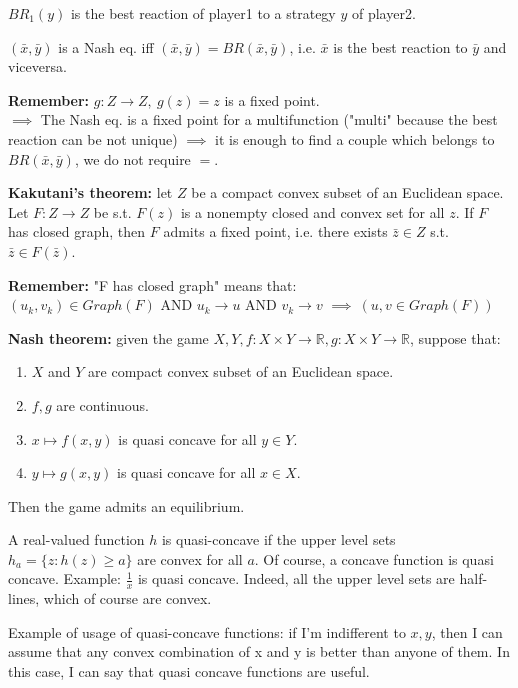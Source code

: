 \noindent $BR_1(y)$ is the best reaction of player1 to a strategy $y$ of player2.

\noindent $(\bar{x},\bar{y})$ is a Nash eq. iff $(\bar{x},\bar{y}) = BR(\bar{x},\bar{y})$, i.e. $\bar{x}$ is the best 
reaction to $\bar{y}$ and viceversa.

\bigskip
\noindent \textbf{Remember:} $g: Z \rightarrow Z, ~g(z) = z$ is a fixed point.\\
$\implies$
The Nash eq. is a fixed point for a multifunction ("multi" 
because the best reaction can be not unique) $\implies$ it is enough to 
find a couple which belongs to $BR(\bar{x},\bar{y})$, we do not require $=$.

\bigskip
\noindent \textbf{Kakutani's theorem:} let $Z$ be a compact convex subset of 
an Euclidean space. Let $F: Z \rightarrow Z$ be s.t. $F(z)$ is a 
nonempty closed and convex set for all $z$. If $F$ has closed graph, then 
$F$ admits a fixed point, i.e. there exists $\bar{z} \in Z$ s.t. $\bar{z} \in F(\bar{z})$.

\bigskip
\noindent \textbf{Remember:} "F has closed graph" means that:\\
$(u_k,v_k) \in Graph(F)$ AND 
$u_k \rightarrow u$ AND 
$v_k \rightarrow v$ 
$\implies ~(u,v \in Graph(F))$

\bigskip
\noindent \textbf{Nash theorem:} given the game 
$X,Y,f:X\times Y \rightarrow \mathbb{R}, g:X\times Y \rightarrow \mathbb{R}$, 
suppose that:
\begin{enumerate}
	\item $X$ and $Y$ are compact convex subset of an Euclidean space.
	\item $f,g$ are continuous.
	\item $x \mapsto f(x,y)$ is quasi concave for all $y \in Y$.
	\item $y \mapsto g(x,y)$ is quasi concave for all $x \in X$.	
\end{enumerate}
Then the game admits an equilibrium.

\bigskip
\noindent A real-valued function $h$ is quasi-concave if the upper level sets 
$h_a = \{z: h(z)\geq a\}$ are convex for all $a$. Of 
course, a concave function is quasi concave. Example: $\frac{1}{x}$ is 
quasi concave. Indeed, all the upper level sets are half-lines, which of 
course are convex.

\noindent Example of usage of quasi-concave functions: if I'm indifferent to $x,y$, then I can assume that any 
convex combination of x and y is better than anyone of them. In this case, 
I can say that quasi concave functions are useful.

